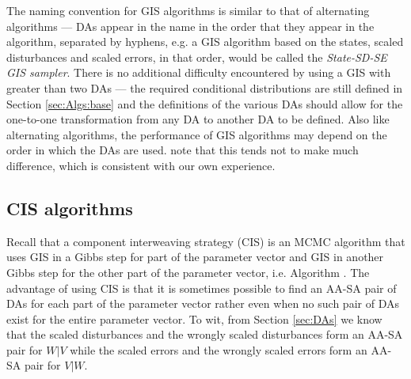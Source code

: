 \documentclass{article}
\begin{document}
The naming convention for GIS algorithms is similar to that of alternating algorithms --- DAs appear in the name in the order that they appear in the algorithm, separated by hyphens, e.g. a GIS algorithm based on the states, scaled disturbances and scaled errors, in that order, would be called the {\it State-SD-SE GIS sampler}. There is no additional difficulty encountered by using a GIS with greater than two DAs --- the required conditional distributions are still defined in Section \ref{sec:Algs:base} and the definitions of the various DAs should allow for the one-to-one transformation from any DA to another DA to be defined.  Also like alternating algorithms, the performance of GIS algorithms may depend on the order in which the DAs are used.  note that this tends not to make much difference, which is consistent with our own experience.

\subsection{CIS algorithms}\label{sec:Algs:CIS}
Recall that a component interweaving strategy (CIS) is an MCMC algorithm that uses GIS in a Gibbs step for part of the parameter vector and GIS in another Gibbs step for the other part of the parameter vector, i.e. Algorithm . The advantage of using CIS is that it is sometimes possible to find an AA-SA pair of DAs for each part of the parameter vector rather even when no such pair of DAs exist for the entire parameter vector. To wit, from Section \ref{sec:DAs} we know that the scaled disturbances and the wrongly scaled disturbances form an AA-SA pair for $W|V$ while the scaled errors and the wrongly scaled errors form an AA-SA pair for $V|W$. 
\end{document}
